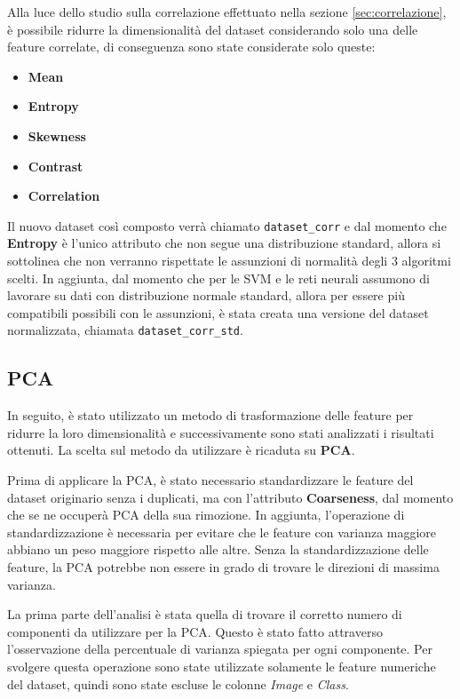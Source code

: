 Alla luce dello studio sulla correlazione effettuato nella sezione \ref{sec:correlazione},
è possibile ridurre la dimensionalità del dataset considerando solo una delle
feature correlate, di conseguenza sono state considerate solo queste:
\begin{itemize}
      \item \textbf{Mean}
      \item \textbf{Entropy}
      \item \textbf{Skewness}
      \item \textbf{Contrast}
      \item \textbf{Correlation}
\end{itemize}
Il nuovo dataset così composto verrà chiamato \texttt{dataset\_corr} e dal momento
che \textbf{Entropy} è l'unico attributo che non segue una distribuzione standard,
allora si sottolinea che non verranno rispettate le assunzioni di normalità degli
$3$ algoritmi scelti. In aggiunta, dal momento che per le SVM e le reti neurali assumono di
lavorare su dati con distribuzione normale standard, allora per essere più
compatibili possibili con le assunzioni, è stata creata una versione del dataset
normalizzata, chiamata \texttt{dataset\_corr\_std}.

\subsection{PCA} \label{sec:pca}
In seguito, è stato utilizzato un metodo di trasformazione delle feature per 
ridurre la loro dimensionalità e successivamente sono stati analizzati i
risultati ottenuti. La scelta sul metodo da utilizzare è ricaduta su \textbf{PCA}.

Prima di applicare la PCA, è stato necessario standardizzare le feature del dataset
originario senza i duplicati, ma con l'attributo \textbf{Coarseness}, dal momento
che se ne occuperà PCA della sua rimozione. In aggiunta, l'operazione di
standardizzazione è necessaria per evitare che le feature con varianza maggiore
abbiano un peso maggiore rispetto alle altre. Senza la standardizzazione delle feature,
la PCA potrebbe non essere in grado di trovare le direzioni di massima varianza.

La prima parte dell'analisi è stata quella di trovare il corretto numero di
componenti da utilizzare per la PCA. Questo è stato fatto attraverso
l'osservazione della percentuale di varianza spiegata per ogni componente. Per
svolgere questa operazione sono state utilizzate solamente le feature numeriche
del dataset, quindi sono state escluse le colonne \textit{Image} e \textit{Class}.

